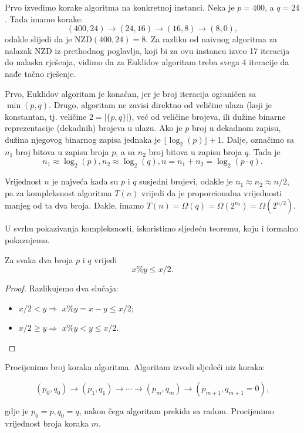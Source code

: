 \begin{solution}
	Prvo izvedimo korake algoritma na konkretnoj instanci. Neka je $p=400$, a $q=24$. Tada imamo korake:
	$$(400, 24) \rightarrow (24, 16) \rightarrow (16, 8) \rightarrow (8, 0),$$
	odakle slijedi da je NZD$(400, 24)=8$. Za razliku od naivnog algoritma za nalazak NZD iz prethodnog poglavlja, koji bi za ovu instancu izveo 17 iteracija do nalaska rješenja, vidimo da za Euklidov algoritam treba svega 4 iteracije da nađe tačno rješenje. 
	
	Prvo, Euklidov algoritam je konačan, jer je broj iteracija ograničen sa $\min(p, q)$. Drugo, algoritam ne zavisi direktno od veličine ulaza (koji je konstantan, tj. veličine $2=|\{p, q\}|$), već od veličine brojeva, ili dužine binarne reprezentacije (dekadnih) brojeva u ulazu. Ako je $p$ broj u dekadnom zapisu, dužina njegovog binarnog zapisa jednaka je $\lfloor \log_2(p) \rfloor+1$. Dalje, označimo sa $n_1$   broj bitova u zapisu broja $p$, a sa $n_2$  broj bitova u zapisu broja $q$. 
	Tada je
	$$n_1 \approx \log_2(p), n_2 \approx \log_2(q),  n = n_1 + n_2 = \log_2(p \cdot q ).$$
	
	Vrijednost $n$ je najveća kada su $p$ i $q$ susjedni brojevi, odakle je $ n_1 \approx n_2 \approx n/2$,  pa za kompleksnost algoritma $T(n)$ vrijedi da je proporcionalna vrijednosti manjeg od
	ta dva broja.  
	Dakle, imamo $T(n)  = \Omega(q) = \Omega(2^{n_2}) =  \Omega(2^{n/2})$.
	
	U svrhu pokazivanja kompleksnosti, iskoristimo sljedeću teoremu, koju i formalno pokazujemo. 
	\begin{theorem}
		 Za svaka dva broja $p$ i $q$ vrijedi
		 $$ x \% y \leq x / 2.$$
	\end{theorem}
	 
	 \begin{proof}
	 	Razlikujemo dva slučaja:
	 	\begin{itemize}
	 		\item $x/2 < y \Rightarrow$  $x\%y = x  - y  \leq x/2 $;
            \item $x/2 \geq  y\Rightarrow$ $x\% y < y \leq x / 2$.
	 	\end{itemize}
	 \end{proof}
	
Procijenimo broj koraka algoritma. Algoritam izvodi sljedeći niz koraka:

$$(p_0,  q_0 ) \rightarrow (p_1, q_1) \rightarrow \cdots \rightarrow (p_m,q_m ) \rightarrow (p_{m+1}, q_{m+1}=0),$$	
	
	gdje je $p_0 = p, q_0 = q$, nakon čega algoritam prekida sa radom. Procijenimo vrijednost broja koraka $m$. 
	

\end{solution}
